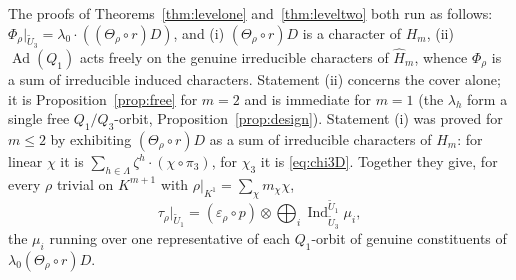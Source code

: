 \documentclass[11pt]{article}
\newcommand{\Ind}{\operatorname{Ind}}
\newcommand{\Ad}{\operatorname{Ad}}
\newcommand{\tU}{\widetilde U}
\theoremstyle{plain}
\theoremstyle{definition}
\begin{document}
The proofs of Theorems~\ref{thm:levelone} and~\ref{thm:leveltwo} both
run as follows: $\Phi_\rho|_{\tU_3}=\lambda_0\cdot((\Theta_\rho\circ r)D)$,
and (i) $(\Theta_\rho\circ r)D$ is a character of $H_m$, (ii) $\Ad(Q_1)$
acts freely on the genuine irreducible characters of $\hat H_m$, whence
$\Phi_\rho$ is a sum of irreducible induced characters.  Statement (ii)
concerns the cover alone; it is Proposition~\ref{prop:free} for $m=2$
and is immediate for $m=1$ (the $\lambda_h$ form a single free
$Q_1/Q_3$-orbit, Proposition~\ref{prop:design}).  Statement (i) was
proved for $m\le2$ by exhibiting $(\Theta_\rho\circ r)D$ as a sum of
irreducible characters of $H_m$: for linear $\chi$ it is
$\sum_{h\in\Lambda}\zeta^{h}\cdot(\chi\circ\pi_3)$, for $\chi_3$ it is
\eqref{eq:chi3D}.  Together they give, for every $\rho$ trivial on
$K^{m+1}$ with $\rho|_{K^1}=\sum_\chi m_\chi\chi$,
\[
 \tau_\rho|_{\tU_1}=(\varepsilon_\rho\circ p)\otimes\bigoplus_i\Ind_{\tU_3}^{\tU_1}\mu_i ,
\]
the $\mu_i$ running over one representative of each $Q_1$-orbit of
genuine constituents of $\lambda_0(\Theta_\rho\circ r)D$.
\end{document}
